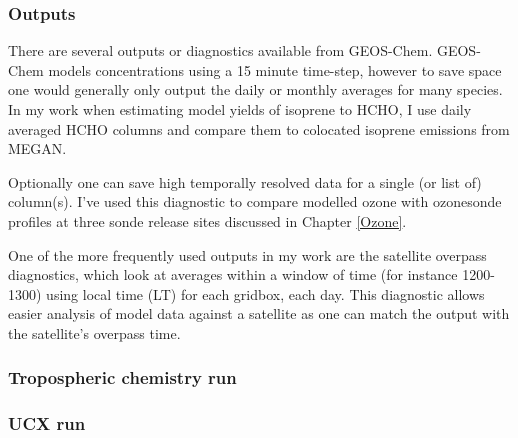     \subsubsection{Outputs}
    
      There are several outputs or diagnostics available from GEOS-Chem.
      GEOS-Chem models concentrations using a 15 minute time-step, however to save space one would generally only output the daily or monthly averages for many species.
      In my work when estimating model yields of isoprene to HCHO, I use daily averaged HCHO columns and compare them to colocated isoprene emissions from MEGAN.
      
      Optionally one can save high temporally resolved data for a single (or list of) column(s).
      I've used this diagnostic to compare modelled ozone with ozonesonde profiles at three sonde release sites discussed in Chapter \ref{Ozone}.
            
      One of the more frequently used outputs in my work are the satellite overpass diagnostics, which look at averages within a window of time (for instance 1200-1300) using local time (LT) for each gridbox, each day.
      This diagnostic allows easier analysis of model data against a satellite as one can match the output with the satellite's overpass time.
      
      
    \subsubsection{Tropospheric chemistry run}
    
    \subsubsection{UCX run}
    
